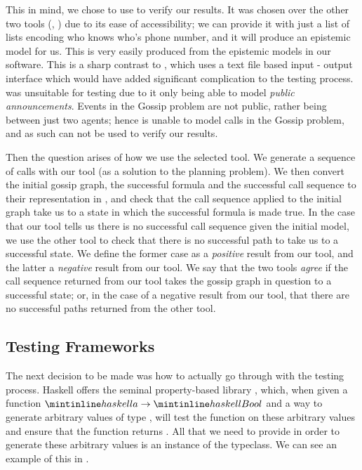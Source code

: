 \documentclass[ %
                    author={Leo Poulson},
                supervisor={Dr. Steven Ramsay},
                    degree={BSc},
                     title={Epistemic Planning for the Dynamic Gossip problem},
                  subtitle={},
                      year={2019} ]{dissertation}
\begin{document}
This in mind, we chose to use \cite{GithubGossip} to verify our results. It was
chosen over the other two tools (\cite{SMCDEL}, \cite{DEMO-S5}) due to its ease
of accessibility; we can provide it with just a list of lists encoding who knows
who's phone number, and it will produce an epistemic model for us. This is very
easily produced from the epistemic models in our software. This is a sharp
contrast to \cite{SMCDEL}, which uses a text file based input - output interface
which would have added significant complication to the testing process.
\cite{DEMO-S5} was unsuitable for testing due to it only being able to model
\emph{public announcements}. Events in the Gossip problem are not public, rather
being between just two agents; hence \cite{DEMO-S5} is unable to model calls in
the Gossip problem, and as such can not be used to verify our results.

Then the question arises of how we use the selected tool. We generate a sequence
of calls with our tool (as a solution to the planning problem). We then convert
the initial gossip graph, the successful formula and the successful call
sequence to their representation in \cite{GithubGossip}, and check that the call
sequence applied to the initial graph take us to a state in which the successful
formula is made true. In the case that our tool tells us there is no successful
call sequence given the initial model, we use the other tool to check that
there is no successful path to take us to a successful state. We define the
former case as a \emph{positive} result from our tool, and the latter a
\emph{negative} result from our tool. We say that the two tools \emph{agree} if
the call sequence returned from our tool takes the gossip graph in question to a
successful state; or, in the case of a negative result from our tool, that there
are no successful paths returned from the other tool.

\subsection{Testing Frameworks}
\label{sec:TestingFrameworks}

The next decision to be made was how to actually go through with the testing
process. Haskell offers the seminal property-based library ,
which, when given a function $\mih{a} \rightarrow \mih{Bool}$ and a way to
generate arbitrary values of type , will test the function on these
arbitrary values and ensure that the function returns . All that we need
to provide in order to generate these arbitrary values is an instance of the
 typeclass. We can see an example of this in .
\end{document}
